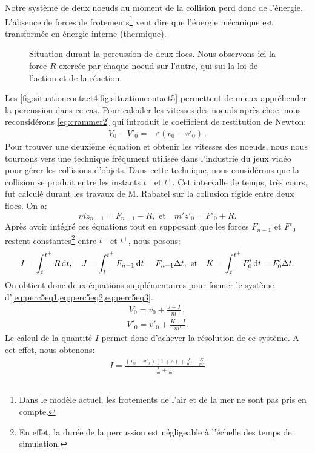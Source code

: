 Notre système de deux noeuds au moment de la collision perd donc de l'énergie. L'absence de forces de frotements\footnote{Dans le modèle actuel, les frotements de l'air et de la mer ne sont pas pris en compte.} veut dire que l'énergie mécanique est transformée en énergie interne (thermique). 
\begin{figure}[!h]
    \centering
    \caption{Situation durant la percussion de deux floes. Nous observons ici la force $R$ exercée par chaque noeud sur l'autre, qui sui la loi de l'action et de la réaction.}
    \label{fig:situationcontact5}
\end{figure}
Les \cref{fig:situationcontact4,fig:situationcontact5} permettent de mieux appréhender la percussion dans ce cas. Pour calculer les vitesses des noeuds après choc, nous reconsidérons \cref{eq:crammer2} qui introduit le coefficient de restitution de Newton:
\begin{align} \label{eq:perc5eq1}
    V_0 - V'_0 = - \varepsilon (v_0 - v'_0) \,.
\end{align}
Pour trouver une deuxième équation et obtenir les vitesses des noeuds, nous nous tournons vers une technique fréqument utilisée dans l'industrie du jeux vidéo\parencite{hecker1997collision} pour gérer les collisions d'objets. Dans cette technique, nous considérons que la collision se produit entre les instants $t^{-}$ et $t^{+}$. Cet intervalle de temps, très cours, fut calculé durant les travaux de M. Rabatel \parencite[p.87]{rabatel2015thesis} sur la collusion rigide entre deux floes. On a:
$$
m \ddot z_{n-1} = F_{n-1} - R, \text{ et} \quad  m'z'_0 = F'_0 + R.
$$
Après avoir intégré ces équations tout en supposant que les forces $F_{n-1}$ et $F'_0$ restent constantes\footnote{En effet, la durée de la percussion est négligeable à l'échelle des temps de simulation.} entre $t^{-}$ et $t^{+}$, nous posons:
$$
I = \int_{t^{-}}^{t^{+}} R \diff t, \quad  J = \int_{t^{-}}^{t^{+}} F_{n-1} \diff t = F_{n-1} \Delta t, \text{ et} \quad  K = \int_{t^{-}}^{t^{+}} F'_{0} \diff t = F'_{0} \Delta t.
$$
On obtient donc deux équations supplémentaires pour former le système d'\cref{eq:perc5eq1,eq:perc5eq2,eq:perc5eq3}.
\begin{align} \label{eq:perc5eq2}
    V_0 = v_0 + \frac{J-I}{m} \,,
\end{align}
\begin{align} \label{eq:perc5eq3}
    V'_0 = v'_0 + \frac{K+I}{m'}.
\end{align}
Le calcul de la quantité $I$ permet donc d'achever la résolution de ce système. A cet effet, nous obtenons:
\begin{align}
    I = \frac{(v_0 - v'_0)(1+\varepsilon) +\frac{J}{m} - \frac{K}{m'}}{\frac{1}{m}+\frac{1}{m'}}
\end{align}

